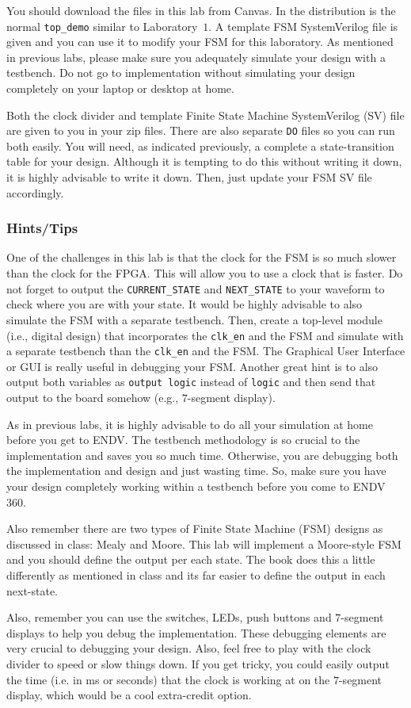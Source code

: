 \documentclass{article}
\begin{document}
You should download the files in this lab from Canvas.  In the
distribution is the normal \verb!top_demo! similar to Laboratory~$1$.
A template FSM SystemVerilog file is given and you can use it to
modify your FSM for this laboratory.  As mentioned in previous labs,
please make sure you adequately simulate your design with a
testbench.  Do not go to implementation without simulating your design
completely on your laptop or desktop at home.

Both the clock divider and template Finite
State Machine SystemVerilog (SV)
file are given to you in your zip files.  There are also separate
\verb!DO! files so you can run both easily.  You will need, as
indicated previously, a complete a state-transition table for your
design.  Although it is tempting to do this without writing it down,
it is highly advisable to write it down.
Then, just update your FSM SV file accordingly.

\subsubsection{Hints/Tips}

One of the challenges in this lab is that the clock for the FSM is so
much slower than the clock for the FPGA.  This will allow you to use a
clock that is faster.  Do not forget to output the
\verb!CURRENT_STATE! and \verb!NEXT_STATE! to your waveform to check
where you are with your state.
It would be highly advisable
to also simulate the FSM with a separate testbench.  Then, create a
top-level module (i.e., digital design) that incorporates the
\verb!clk_en! and the FSM and simulate with a separate testbench than
the \verb!clk_en! and the FSM.  The Graphical User Interface or GUI
is really useful in debugging your FSM. Another great hint
is to also output both
variables as \verb!output logic! instead of \verb!logic! and then send
that output to the board somehow (e.g., $7$-segment display).

As in previous labs, it is highly advisable to do all your simulation
at home before you get to ENDV.  The testbench methodology is so
crucial to the implementation and saves you so much time.  Otherwise,
you are debugging both the implementation and design and just wasting
time.  So, make sure you have your design completely working within a
testbench before you come to ENDV 360.

Also remember there are two types of Finite State Machine (FSM)
designs as discussed in class:
Mealy and Moore.  This lab will implement a Moore-style FSM and you
should define the output per each state.  The book does this a little
differently as mentioned in class and its far easier to define the
output in each next-state. 

Also, remember you can use the switches, LEDs, push buttons and
$7$-segment displays to help you debug the implementation.  These
debugging elements are very crucial to debugging your design.  Also,
feel free to play with the clock divider to speed or slow things
down.  If you get tricky, you could easily output the time (i.e. in
ms or seconds) that the
clock is working at on the $7$-segment display, which would be a cool
extra-credit option.  



\end{document}
